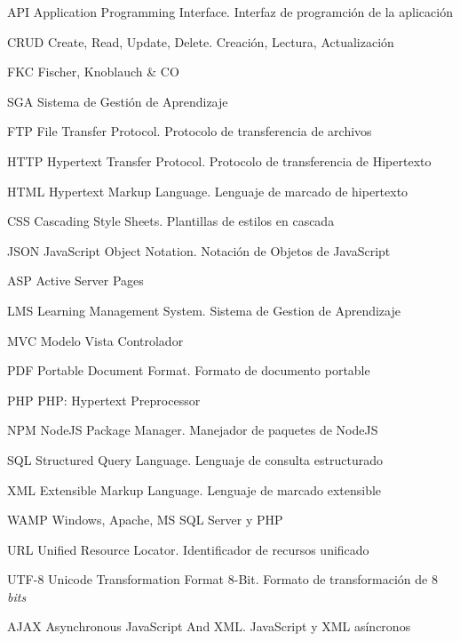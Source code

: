 	{API}
	{Application Programming Interface. Interfaz de programción de la aplicación}

	{CRUD}
	{Create, Read, Update, Delete. Creación, Lectura, Actualización}

	{FKC}
	{Fischer, Knoblauch \& CO}

	{SGA}
	{Sistema de Gestión de Aprendizaje}

	{FTP}
	{File Transfer Protocol. Protocolo de transferencia de archivos}

	{HTTP}
	{Hypertext Transfer Protocol. Protocolo de transferencia de Hipertexto}

	{HTML}
	{Hypertext Markup Language. Lenguaje de marcado de hipertexto}

	{CSS}
	{Cascading Style Sheets. Plantillas de estilos en cascada}

	{JSON}
	{JavaScript Object Notation. Notación de Objetos de JavaScript}

	{ASP}
	{Active Server Pages}

	{LMS}
	{Learning Management System. Sistema de Gestion de Aprendizaje}

	{MVC}
	{Modelo Vista Controlador}

	{PDF}
	{Portable Document Format. Formato de documento portable}

	{PHP}
	{PHP: Hypertext Preprocessor}

	{NPM}
	{NodeJS Package Manager. Manejador de paquetes de NodeJS}

	{SQL}
	{Structured Query Language. Lenguaje de consulta estructurado}

	{XML}
	{Extensible Markup Language. Lenguaje de marcado extensible}

	{WAMP}
	{Windows, Apache, MS SQL Server y PHP}

	{URL}
	{Unified Resource Locator. Identificador de recursos unificado}

	{UTF-8}
	{Unicode Transformation Format 8-Bit. Formato de transformación de 8 \emph{bits}}

	{AJAX}
	{Asynchronous JavaScript And XML. JavaScript y XML asíncronos}

